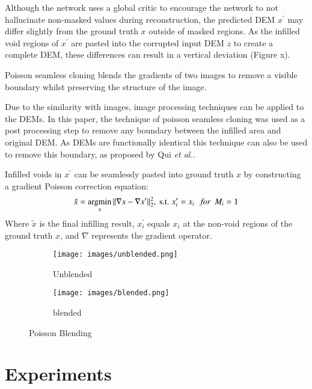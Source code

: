 \documentclass[twocolumn]{article}
\begin{document}
Although the network uses a global critic to encourage the network to not hallucinate non-masked values during reconstruction, the predicted DEM \(x^\prime\) may differ slightly from the ground truth \(x\) outside of masked regions.
As the infilled void regions of \(x^\prime\) are pasted into the corrupted input DEM \(z\) to create a complete DEM, these differences can result in a vertical deviation (Figure x).

Poisson seamless cloning\autocite{perezPoissonImageEditing2003} blends the gradients of two images to remove a visible boundary whilst preserving the structure of the image.

Due to the similarity with images, image processing techniques can be applied to the DEMs.
In this paper, the technique of poisson seamless cloning\autocite{perezPoissonImageEditing2003} was used as a post processing step to remove any boundary between the infilled area and original DEM.
As DEMs are functionally identical this technique can also be used to remove this boundary, as proposed by Qui \emph{et al.}\autocite{qiuVoidFillingDigital2019}.

Infilled voids in \(x^\prime\) can be seamlessly pasted into ground truth \(x\) by constructing a gradient Poisson correction equation:
\begin{equation}
\tilde{x} = \operatorname*{argmin}_x \Vert \nabla x - \nabla x^\prime \Vert^2_2, \text{ s.t. } x^\prime_i = x_i  \text{ \space \space \it{for} \space } M_i = 1
\end{equation}
Where \(\tilde{x}\) is the final infilling result, \(x^\prime_i\) equals \(x_i\) at the non-void regions of the ground truth \(x\), and \(\nabla\) represents the gradient operator.

\begin{figure}
\centering
\begin{subfigure}{0.4\textwidth}
    \texttt{[image: images/unblended.png]}
    \caption{Unblended}
    \label{fig:unblended}
\end{subfigure}
\hfill
\begin{subfigure}{0.4\textwidth}
    \texttt{[image: images/blended.png]}
    \caption{blended}
    \label{fig:blended}
\end{subfigure}
\caption{\label{fig:poisson}Poisson Blending}
\end{figure}

\section{Experiments}
\label{sec:orga2b09e5}
\end{document}
